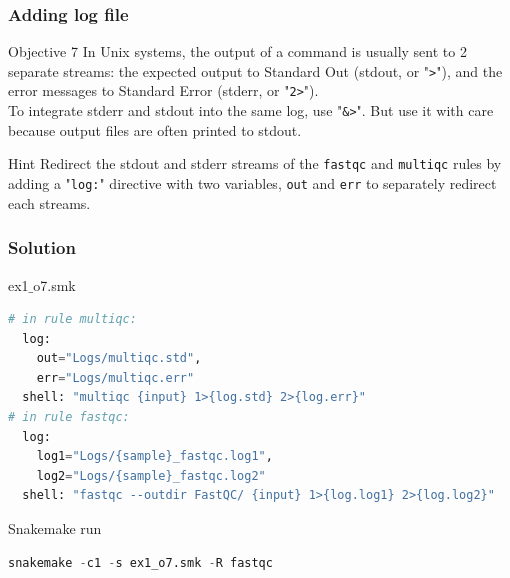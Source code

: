 \begin{frame}[containsverbatim]
\frametitle{Adding log file}
\begin{exampleblock}{Objective 7}
In Unix systems, the output of a command is usually sent to 2 separate streams: the expected output to Standard Out (stdout, or "\verb|>|"), and the error messages to Standard Error (stderr, or "\verb|2>|"). \\
To integrate stderr and stdout into the same log, use "\verb|&>|". But use it with care because output files are often printed to stdout.
\end{exampleblock}
\begin{exampleblock}{Hint}
Redirect the stdout and stderr streams of the \verb|fastqc| and \verb|multiqc|  rules by adding a "\verb|log:|" directive with two variables, \verb|out| and \verb|err| to separately redirect each streams.
\end{exampleblock}
\end{frame}
\begin{frame}[containsverbatim]
\frametitle{Solution}
\begin{exampleblock}{ex1$\_$o7.smk}
\begin{lstlisting}[language=python]
# in rule multiqc:
  log:
    out="Logs/multiqc.std",
    err="Logs/multiqc.err"
  shell: "multiqc {input} 1>{log.std} 2>{log.err}"
# in rule fastqc:
  log:
    log1="Logs/{sample}_fastqc.log1",
    log2="Logs/{sample}_fastqc.log2"
  shell: "fastqc --outdir FastQC/ {input} 1>{log.log1} 2>{log.log2}"
\end{lstlisting}
\end{exampleblock}
\begin{exampleblock}{Snakemake run}
\begin{lstlisting}[language=python]
snakemake -c1 -s ex1_o7.smk -R fastqc
\end{lstlisting}
\end{exampleblock}
\end{frame}